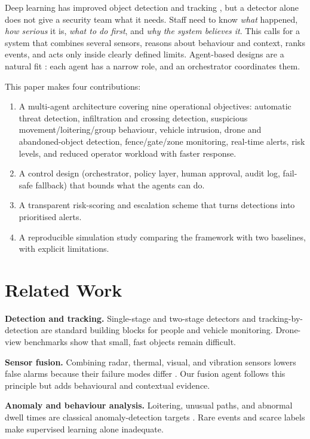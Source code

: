 \documentclass[conference]{IEEEtran}
\begin{document}
Deep learning has improved object detection \cite{redmon2016,ren2015} and tracking \cite{bewley2016,wojke2017}, but a detector alone does not give a security team what it needs. Staff need to know \emph{what} happened, \emph{how serious} it is, \emph{what to do first}, and \emph{why the system believes it}. This calls for a system that combines several sensors, reasons about behaviour and context, ranks events, and acts only inside clearly defined limits. Agent-based designs are a natural fit \cite{wooldridge1995,wang2024}: each agent has a narrow role, and an orchestrator coordinates them.

This paper makes four contributions:
\begin{enumerate}
\item A multi-agent architecture covering nine operational objectives: automatic threat detection, infiltration and crossing detection, suspicious movement/loitering/group behaviour, vehicle intrusion, drone and abandoned-object detection, fence/gate/zone monitoring, real-time alerts, risk levels, and reduced operator workload with faster response.
\item A control design (orchestrator, policy layer, human approval, audit log, fail-safe fallback) that bounds what the agents can do.
\item A transparent risk-scoring and escalation scheme that turns detections into prioritised alerts.
\item A reproducible simulation study comparing the framework with two baselines, with explicit limitations.
\end{enumerate}

\section{Related Work}
\textbf{Detection and tracking.} Single-stage and two-stage detectors \cite{redmon2016,ren2015} and tracking-by-detection \cite{bewley2016,wojke2017} are standard building blocks for people and vehicle monitoring. Drone-view benchmarks \cite{zhu2022} show that small, fast objects remain difficult.

\textbf{Sensor fusion.} Combining radar, thermal, visual, and vibration sensors lowers false alarms because their failure modes differ \cite{hall1997}. Our fusion agent follows this principle but adds behavioural and contextual evidence.

\textbf{Anomaly and behaviour analysis.} Loitering, unusual paths, and abnormal dwell times are classical anomaly-detection targets \cite{chandola2009}. Rare events and scarce labels make supervised learning alone inadequate.
\end{document}
